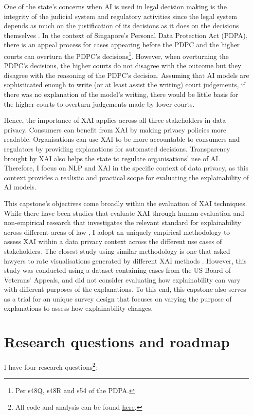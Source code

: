 One of the state's concerns when AI is used in legal decision making is the integrity of the judicial system and regulatory activities since the legal system depends as much on the justification of its decisions as it does on the decisions themselves \cite{chesterman2021_opacity}. In the context of Singapore's Personal Data Protection Act (PDPA), there is an appeal process for cases appearing before the PDPC and the higher courts can overturn the PDPC's decisions\footnote{Per s48Q, s48R and s54 of the PDPA.}. However, when overturning the PDPC's decisions, the higher courts do not disagree with the outcome but they disagree with the reasoning of the PDPC's decision. Assuming that AI models are sophisticated enough to write (or at least assist the writing) court judgements, if there was no explanation of the model's writing, there would be little basis for the higher courts to overturn judgements made by lower courts. 

Hence, the importance of XAI applies across all three stakeholders in data privacy. Consumers can benefit from XAI by making privacy policies more readable. Organisations can use XAI to be more accountable to consumers and regulators by providing explanations for automated decisions. Transparency brought by XAI also helps the state to regulate organisations' use of AI. Therefore, I focus on NLP and XAI in the specific context of data privacy, as this context provides a realistic and practical scope for evaluating the explainability of AI models.

This capstone's objectives come broadly within the evaluation of XAI techniques. While there have been studies that evaluate XAI through human evaluation \cite{vilone2021} and non-empirical research that investigates the relevant standard for explainability across different areas of law \cite{hacker2022varieties}, I adopt an uniquely empirical methodology to assess XAI within a data privacy context across the different use cases of stakeholders. The closest study using similar methodology is one that asked lawyers to rate visualisations generated by different XAI methods \cite{gorski2021}. However, this study was conducted using a dataset containing cases from the US Board of Veterans' Appeals, and did not consider evaluating how explainability can vary with different purposes of the explanations. To this end, this capstone also serves as a trial for an unique survey design that focuses on varying the purpose of explanations to assess how explainability changes.

\section{Research questions and roadmap}
\label{chap1:research_questions}
I have four research questions\footnote{All code and analysis can be found \href{https://github.com/TristanKoh/capstone-repo/}{here}.}: 

